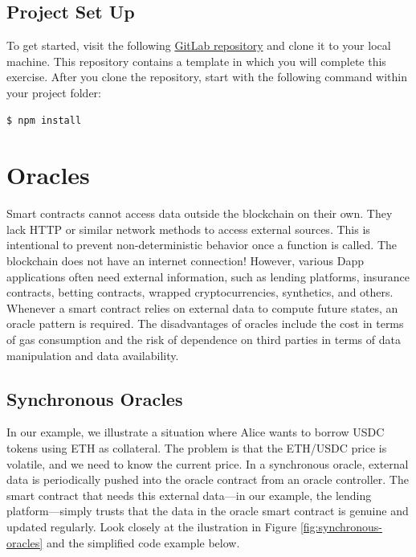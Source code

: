 \documentclass[12pt]{article}
\begin{document}

\subsection*{Project Set Up}

To get started, visit the following \href{https://gitlab.fel.cvut.cz/radovluk/smart-contracts-exercises/-/tree/main/06-Fool-the-Oracle/task/task-code}{GitLab repository} and clone it to your local machine. This repository contains a template in which you will complete this exercise. After you clone the repository, start with the following command within your project folder:

\begin{verbatim}
$ npm install
\end{verbatim}

\section{Oracles}
Smart contracts cannot access data outside the blockchain on their own. They lack HTTP or similar network methods to access external sources. This is intentional to prevent non-deterministic behavior once a function is called. The blockchain does not have an internet connection! However, various Dapp applications often need external information, such as lending platforms, insurance contracts, betting contracts, wrapped cryptocurrencies, synthetics, and others. Whenever a smart contract relies on external data to compute future states, an oracle pattern is required. The disadvantages of oracles include the cost in terms of gas consumption and the risk of dependence on third parties in terms of data manipulation and data availability.

\subsection*{Synchronous Oracles}

In our example, we illustrate a situation where Alice wants to borrow USDC tokens using ETH as collateral. The problem is that the ETH/USDC price is volatile, and we need to know the current price. In a synchronous oracle, external data is periodically pushed into the oracle contract from an oracle controller. The smart contract that needs this external data—in our example, the lending platform—simply trusts that the data in the oracle smart contract is genuine and updated regularly. Look closely at the ilustration in Figure \ref{fig:synchronous-oracles} and the simplified code example below.
\end{document}
